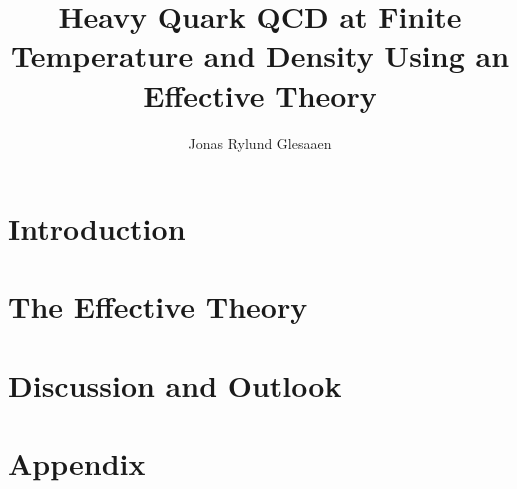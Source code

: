 \documentclass[%
  12pt,%
  twoside,%
  openright,%
  cleardoublepage=empty%
]{scrreprt}
\author{Jonas Rylund Glesaaen}
\title{Heavy Quark QCD at Finite Temperature and Density Using an Effective Theory}
\begin{document}



\cleardoublepage


\cleardoublepage
{}
\tableofcontents

\cleardoublepage


\cleardoublepage


\cleardoublepage


\cleardoublepage
{}


\part{Introduction}
\cleardoublepage

\cleardoublepage

\cleardoublepage



\cleardoublepage
\part{The Effective Theory}
\cleardoublepage

\cleardoublepage



\cleardoublepage
\part{Discussion and Outlook}
\cleardoublepage

\cleardoublepage



\cleardoublepage
\appendix
\part{Appendix}
\cleardoublepage

\cleardoublepage



\cleardoublepage



\cleardoublepage

\end{document}
